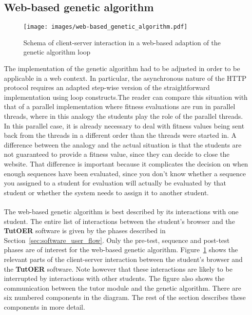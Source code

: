 \subsection{Web-based genetic algorithm}
\label{sec:web-based_ga}
\begin{figure}[ht]
	\centering
	\texttt{[image: images/web-based\_genetic\_algorithm.pdf]}
	\caption{Schema of client-server interaction in a web-based adaption of the
	genetic algorithm loop}
	\label{fig:web-based_ga}
\end{figure}
The implementation of the genetic algorithm had to be adjusted in order to be
applicable in a web context. In particular, the asynchronous nature of the HTTP
protocol requires an adapted step-wise version of the straightforward implementation
using loop constructs.The reader can compare this situation with that of a parallel
implementation where fitness evaluations are run in parallel threads, where in
this analogy the students play the role of the parallel threads. In this parallel
case, it is already necessary to deal with fitness values being sent back from the
threads in a different order than the threads were started in. A difference between
the analogy and the actual situation is that the students are not guaranteed to
provide a fitness value, since they can decide to close the website. That
difference is important because it complicates the decision on when enough
sequences have been evaluated, since you don't know whether a sequence you
assigned to a student for evaluation will actually be evaluated by that
student or whether the system needs to assign it to another student.\\\\
\noindent
The web-based genetic algorithm is best described by its interactions with one
student. The entire list of interactions between the student's browser and the
\textbf{TutOER} software is given by the phases described in Section~\ref{sec:software_user_flow}.
Only the pre-test, sequence and post-test phases are of interest for the web-based
genetic algorithm. Figure~\ref{fig:web-based_ga} shows the relevant parts
of the client-server interaction between the student's browser and the \textbf{TutOER}
software. Note however that these interactions are likely to be interrupted by
interactions with other students. The figure also shows the communication between
the tutor module and the genetic algorithm. There are six numbered components
in the diagram. The rest of the section describes these components in more
detail.

